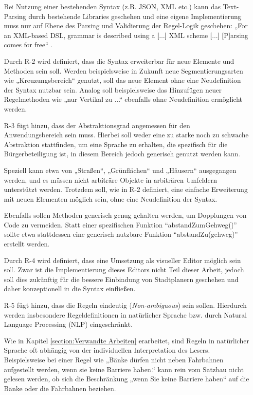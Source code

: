 Bei Nutzung einer bestehenden Syntax (z.B. JSON, XML etc.) kann das Text-Parsing durch bestehende Libraries geschehen und eine eigene Implementierung muss nur auf Ebene des Parsing und Validierung der Regel-Logik geschehen: „For an XML-based DSL, grammar is described using a [...] XML scheme [...] [P]arsing comes for free“ \parencite[S. 330]{mernikWhenHowDevelop2005}.

\medskip

Durch R-2 wird definiert, dass die Syntax erweiterbar für neue Elemente und Methoden sein soll. Werden beispielsweise in Zukunft neue Segmentierungsarten wie „Kreuzungsbereich“ genutzt, soll das neue Element ohne eine Neudefinition der Syntax nutzbar sein. Analog soll beispielsweise das Hinzufügen neuer Regelmethoden wie „nur Vertikal zu ...“ ebenfalls ohne Neudefinition ermöglicht werden.

\medskip

R-3 fügt hinzu, dass der Abstraktionsgrad angemessen für den Anwendungsbereich sein muss. Hierbei soll weder eine zu starke noch zu schwache Abstraktion stattfinden, um eine Sprache zu erhalten, die spezifisch für die Bürgerbeteiligung ist, in diesem Bereich jedoch generisch genutzt werden kann.

Speziell kann etwa von „Straßen“, „Grünflächen“ und „Häusern“ ausgegangen werden, und es müssen nicht arbiträre Objekte in arbiträren Umfeldern unterstützt werden. Trotzdem soll, wie in R-2 definiert, eine einfache Erweiterung mit neuen Elementen möglich sein, ohne eine Neudefinition der Syntax.

Ebenfalls sollen Methoden generisch genug gehalten werden, um Dopplungen von Code zu vermeiden. Statt einer spezifischen Funktion “abstandZumGehweg()” sollte etwa stattdessen eine generisch nutzbare Funktion “abstandZu(gehweg)” erstellt werden.

\medskip

Durch R-4 wird definiert, dass eine Umsetzung als visueller Editor möglich sein soll. Zwar ist die Implementierung dieses Editors nicht Teil dieser Arbeit, jedoch soll dies zukünftig für die bessere Einbindung von Stadtplanern geschehen und daher konzeptionell in die Syntax einfließen.

\medskip

R-5 fügt hinzu, dass die Regeln eindeutig (\textit{Non-ambiguous}) sein sollen. Hierdurch werden insbesondere Regeldefinitionen in natürlicher Sprache bzw. durch Natural Language Processing (NLP) eingeschränkt.

Wie in Kapitel \ref{section:Verwandte Arbeiten} erarbeitet, sind Regeln in natürlicher Sprache oft abhängig von der individuellen Interpretation des Lesers. Beispielsweise bei einer Regel wie „Bänke dürfen nicht neben Fahrbahnen aufgestellt werden, wenn sie keine Barriere haben.“ kann rein vom Satzbau nicht gelesen werden, ob sich die Beschränkung „wenn Sie keine Barriere haben“ auf die Bänke oder die Fahrbahnen beziehen.

